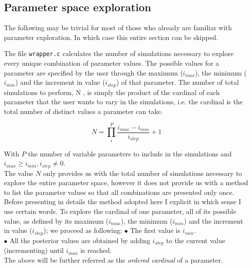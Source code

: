\documentclass[a4paper, 12pt]{article}
\begin{document}
\subsection*{Parameter space exploration}

The following may be trivial for most of those who already are familiar with parameter exploration. In which case this entire section can be skipped.\newline\newline

The file \texttt{wrapper.c} calculates the number of simulations necessary to explore every unique combination of parameter values. The possible values for a parameter are specified by the user through the maximum ($i_{max}$), the minimum ($i_{min}$) and the increment in value ($i_{step}$) of that parameter. The number of total simulations to perform, N , is simply the product of the cardinal of each parameter that the user wants to vary in the simulations, i.e. the cardinal is the total number of distinct values a parameter can take.

$$ N = \prod_{i}^{P} \frac{ i_{max} - i_{min} }{ i_{step} } + 1 $$

With $P$ the number of variable parameters to include in the simulations and $ i_{max} \geq i_{min} , i_{step} \neq 0 $.\\

The value $N$ only provides us with the total number of simulations necessary to explore the entire parameter space, however it does not provide us with a method to list the parameter values so that all combinations are presented only once. 
Before presenting in details the method adopted here I explicit in which sense I use certain words. To explore the cardinal of one parameter, all of its possible value, as defined by its maximum ($i_{max}$), the minimum ($i_{min}$) and the increment in value ($i_{step}$); we proceed as following:
$\bullet$ The first value is $i_{min}$.\\
$\bullet$ All the posterior values are obtained by adding $i_{step}$ to the current value (incrementing) until $i_{max}$ is reached.\\
The above will be further referred as the \textit{ordered cardinal} of a parameter.\newline\newline
\end{document}
